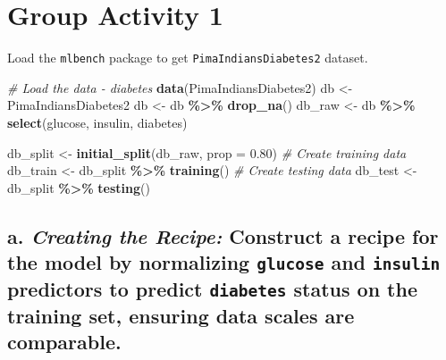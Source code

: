 \documentclass[
]{book}
\newenvironment{Shaded}{\begin{snugshade}}{\end{snugshade}}
\newcommand{\AttributeTok}[1]{\textcolor[rgb]{0.13,0.29,0.53}{#1}}
\newcommand{\CommentTok}[1]{\textcolor[rgb]{0.56,0.35,0.01}{\textit{#1}}}
\newcommand{\FloatTok}[1]{\textcolor[rgb]{0.00,0.00,0.81}{#1}}
\newcommand{\FunctionTok}[1]{\textcolor[rgb]{0.13,0.29,0.53}{\textbf{#1}}}
\newcommand{\NormalTok}[1]{#1}
\newcommand{\OtherTok}[1]{\textcolor[rgb]{0.56,0.35,0.01}{#1}}
\newcommand{\SpecialCharTok}[1]{\textcolor[rgb]{0.81,0.36,0.00}{\textbf{#1}}}
\begin{document}
\hypertarget{group-activity-1-8}{%
\section{Group Activity 1}\label{group-activity-1-8}}

Load the \texttt{mlbench} package to get \texttt{PimaIndiansDiabetes2} dataset.

\begin{Shaded}
\begin{Highlighting}[]
\CommentTok{\# Load the data {-} diabetes}
\FunctionTok{data}\NormalTok{(PimaIndiansDiabetes2)}
\NormalTok{db }\OtherTok{\textless{}{-}}\NormalTok{ PimaIndiansDiabetes2}
\NormalTok{db }\OtherTok{\textless{}{-}}\NormalTok{ db }\SpecialCharTok{\%\textgreater{}\%} \FunctionTok{drop\_na}\NormalTok{() }
\NormalTok{db\_raw }\OtherTok{\textless{}{-}}\NormalTok{ db }\SpecialCharTok{\%\textgreater{}\%} \FunctionTok{select}\NormalTok{(glucose, insulin, diabetes)}

\NormalTok{db\_split }\OtherTok{\textless{}{-}} \FunctionTok{initial\_split}\NormalTok{(db\_raw, }\AttributeTok{prop =} \FloatTok{0.80}\NormalTok{)}
\CommentTok{\# Create training data}
\NormalTok{db\_train }\OtherTok{\textless{}{-}}\NormalTok{ db\_split }\SpecialCharTok{\%\textgreater{}\%} \FunctionTok{training}\NormalTok{()}
\CommentTok{\# Create testing data}
\NormalTok{db\_test }\OtherTok{\textless{}{-}}\NormalTok{ db\_split }\SpecialCharTok{\%\textgreater{}\%} \FunctionTok{testing}\NormalTok{()}
\end{Highlighting}
\end{Shaded}

\hypertarget{a.-creating-the-recipe-construct-a-recipe-for-the-model-by-normalizing-glucose-and-insulin-predictors-to-predict-diabetes-status-on-the-training-set-ensuring-data-scales-are-comparable.}{%
\subsection{\texorpdfstring{a. \emph{Creating the Recipe:} Construct a recipe for the model by normalizing \texttt{glucose} and \texttt{insulin} predictors to predict \texttt{diabetes} status on the training set, ensuring data scales are comparable.}{a. Creating the Recipe: Construct a recipe for the model by normalizing glucose and insulin predictors to predict diabetes status on the training set, ensuring data scales are comparable.}}\label{a.-creating-the-recipe-construct-a-recipe-for-the-model-by-normalizing-glucose-and-insulin-predictors-to-predict-diabetes-status-on-the-training-set-ensuring-data-scales-are-comparable.}}
\end{document}
